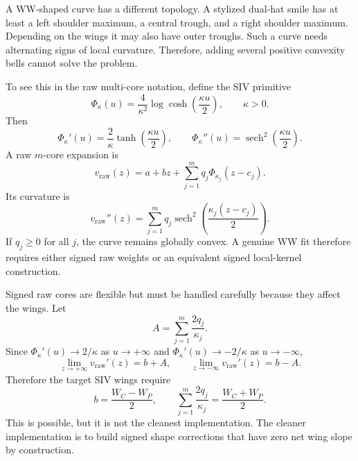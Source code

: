 \documentclass[11pt]{article}
\DeclareMathOperator{\sech}{sech}
\begin{document}
A WW-shaped curve has a different topology.  A stylized dual-hat smile has at least a left shoulder maximum, a central trough, and a right shoulder maximum.  Depending on the wings it may also have outer troughs.  Such a curve needs alternating signs of local curvature.  Therefore, adding several positive convexity bells cannot solve the problem.

To see this in the raw multi-core notation, define the SIV primitive
\begin{equation}
  \Phi_\kappa(u)
  =\frac{4}{\kappa^2}\log\cosh\!\left(\frac{\kappa u}{2}\right),
  \qquad \kappa>0.
  \label{eq:Phi}
\end{equation}
Then
\begin{equation}
  \Phi_\kappa'(u)=\frac{2}{\kappa}\tanh\!\left(\frac{\kappa u}{2}\right),
  \qquad
  \Phi_\kappa''(u)=\sech^2\!\left(\frac{\kappa u}{2}\right).
  \label{eq:Phi-derivatives}
\end{equation}
A raw $m$-core expansion is
\begin{equation}
  v_{\mathrm{raw}}(z)
  =a+bz+\sum_{j=1}^{m}q_j\Phi_{\kappa_j}(z-c_j).
  \label{eq:raw-multicore}
\end{equation}
Its curvature is
\begin{equation}
  v_{\mathrm{raw}}''(z)
  =\sum_{j=1}^{m}q_j
  \sech^2\!\left(\frac{\kappa_j(z-c_j)}{2}\right).
  \label{eq:raw-curvature}
\end{equation}
If $q_j\ge0$ for all $j$, the curve remains globally convex.  A genuine WW fit therefore requires either signed raw weights or an equivalent signed local-kernel construction.

Signed raw cores are flexible but must be handled carefully because they affect the wings.  Let
\begin{equation}
  A=\sum_{j=1}^{m}\frac{2q_j}{\kappa_j}.
\end{equation}
Since $\Phi_\kappa'(u)\to2/\kappa$ as $u\to+\infty$ and $\Phi_\kappa'(u)\to-2/\kappa$ as $u\to-\infty$,
\begin{equation}
  \lim_{z\to+\infty} v_{\mathrm{raw}}'(z)=b+A,
  \qquad
  \lim_{z\to-\infty} v_{\mathrm{raw}}'(z)=b-A.
  \label{eq:raw-wing-slopes}
\end{equation}
Therefore the target SIV wings require
\begin{equation}
  b=\frac{W_C-W_P}{2},
  \qquad
  \sum_{j=1}^{m}\frac{2q_j}{\kappa_j}=\frac{W_C+W_P}{2}.
  \label{eq:raw-wing-constraint}
\end{equation}
This is possible, but it is not the cleanest implementation.  The cleaner implementation is to build signed shape corrections that have zero net wing slope by construction.
\end{document}
